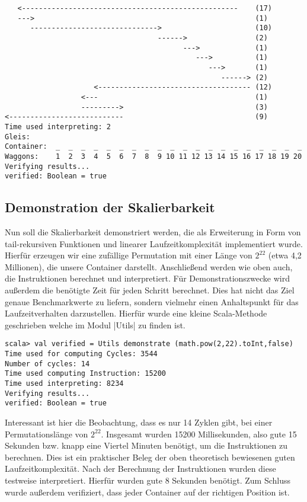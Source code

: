 \begin{lstlisting}
   <---------------------------------------------------    (17)
   --->                                                    (1)
      ------------------------------>                      (10)
                                    ------>                (2)
                                          --->             (1)
                                             --->          (1)
                                                --->       (1)
                                                   ------> (2)
                     <------------------------------------ (12)
                  <---                                     (1)
                  --------->                               (3)
<---------------------------                               (9)
Time used interpreting: 2
Gleis: 
Container:  _  _  _  _  _  _  _  _  _  _  _  _  _  _  _  _  _  _  _  _
Waggons:    1  2  3  4  5  6  7  8  9 10 11 12 13 14 15 16 17 18 19 20
Verifying results...
verified: Boolean = true
\end{lstlisting}
\subsection{Demonstration der Skalierbarkeit}
\label{scalability}
Nun soll die Skalierbarkeit demonstriert werden,
die als Erweiterung in Form von tail-rekursiven Funktionen und linearer Laufzeitkomplexität implementiert wurde.\\
Hierfür erzeugen wir eine zufällige Permutation mit einer Länge von $2^22$ (etwa 4,2 Millionen), die unsere Container darstellt.
Anschließend werden wie oben auch, die Instruktionen berechnet und interpretiert.
Für Demonstrationszwecke wird außerdem die benötigte Zeit für jeden Schritt berechnet.
Dies hat nicht das Ziel genaue Benchmarkwerte zu liefern, sondern vielmehr einen Anhaltspunkt für das Laufzeitverhalten darzustellen.
Hierfür wurde eine kleine Scala-Methode geschrieben welche im Modul |Utils| zu finden ist.
\begin{lstlisting}
scala> val verified = Utils demonstrate (math.pow(2,22).toInt,false)
Time used for computing Cycles: 3544
Number of cycles: 14
Time used computing Instruction: 15200
Time used interpreting: 8234
Verifying results...
verified: Boolean = true
\end{lstlisting}
\lstset{basicstyle=\ttfamily}
Interessant ist hier die Beobachtung, dass es nur 14 Zyklen gibt, bei einer Permutationslänge von $2^22$.
Insgesamt wurden 15200 Millisekunden, also gute 15 Sekunden bzw. knapp eine Viertel Minuten benötigt, um die Instruktionen zu berechnen.
Dies ist ein praktischer Beleg der oben theoretisch bewiesenen guten Laufzeitkomplexität.
Nach der Berechnung der Instruktionen wurden diese testweise interpretiert. Hierfür wurden gute 8 Sekunden benötigt.
Zum Schluss wurde außerdem verifiziert, dass jeder Container auf der richtigen Position ist.
